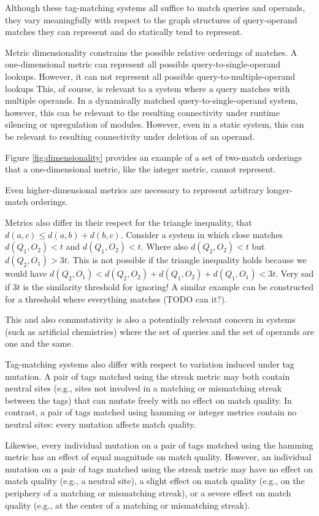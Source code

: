 Although these tag-matching systems all suffice to match queries and operands, they vary meaningfully with respect to the graph structures of query-operand matches they can represent and do statically tend to represent.

Metric dimensionality constrains the possible relative orderings of matches.
A one-dimensional metric can represent all possible query-to-single-operand lookups.
However, it can not represent all possible query-to-multiple-operand lookups
This, of course, is relevant to a system where a query matches with multiple operands.
In a dynamically matched query-to-single-operand system, however, this can be relevant to the resulting connectivity under runtime silencing or upregulation of modules.
However, even in a static system, this can be relevant to resulting connectivity under deletion of an operand.

Figure \ref{fig:dimensionality} provides an example of a set of two-match orderings that a one-dimensional metric, like the integer metric, cannot represent.

Even higher-dimensional metrics are necessary to represent arbitrary longer-match orderings.

Metrics also differ in their respect for the triangle inequality, that $d(a,c) \leq d(a,b) + d(b,c)$.
Consider a system in which close matches $d(Q_1, O_2) < t$ and $d(Q_1, O_2) < t$.
Where also $d(Q_2, O_2) < t$ but $d(Q_2, O_1) > 3t$.
This is not possible if the triangle inequality holds because we would have $d(Q_2, O_1) < d(Q_2, O_2) + d(Q_1, O_2)+ d(Q_1, O_1) < 3t$.
Very sad if $3t$ is the similarity threshold for ignoring!
A similar example can be constructed for a threshold where everything matches (TODO can it?).

This and also commutativity is also a potentially relevant concern in systems (such as artificial chemistries) where the set of queries and the set of operands are one and the same.

Tag-matching systems also differ with respect to variation induced under tag mutation.
A pair of tags matched using the streak metric may both contain neutral sites (e.g., sites not involved in a matching or mismatching streak between the tags) that can mutate freely with no effect on match quality.
In contrast, a pair of tags matched using hamming or integer metrics contain no neutral sites: every mutation affects match quality.

Likewise, every individual mutation on a pair of tags matched using the hamming metric has an effect of equal magnitude on match quality.
However, an individual mutation on a pair of tags matched using the streak metric may have no effect on match quality (e.g., a neutral site), a slight effect on match quality (e.g., on the periphery of a matching or mismatching streak), or a severe effect on match quality (e.g., at the center of a matching or mismatching streak).

